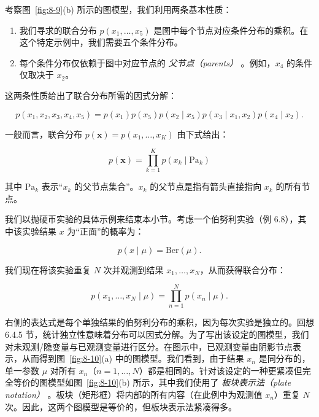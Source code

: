 考察图~\ref{fig:8-9}(b) 所示的图模型，我们利用两条基本性质：

\begin{enumerate}
\item 我们寻求的联合分布 $ p(x_1, \ldots, x_5) $ 是图中每个节点对应条件分布的乘积。在这个特定示例中，我们需要五个条件分布。
\item 每个条件分布仅依赖于图中对应节点的 \emph{父节点（parents）} 。例如，$ x_4 $ 的条件仅取决于 $ x_2 $。
\end{enumerate}

这两条性质给出了联合分布所需的因式分解：

\begin{equation}
p(x_1, x_2, x_3, x_4, x_5) = p(x_1) p(x_5) p(x_2 \mid x_5) p(x_3 \mid x_1, x_2) p(x_4 \mid x_2) .
\tag{8.30}\label{eq:8-30}
\end{equation}

一般而言，联合分布 $ p(\boldsymbol{x}) = p(x_1, \ldots, x_K) $ 由下式给出：

\begin{equation}
p(\boldsymbol{x}) = \prod_{k=1}^K p\left(x_k \mid \text{Pa}_k\right)
\tag{8.31}\label{eq:8-31}
\end{equation}

其中 $ \text{Pa}_k $ 表示“$ x_k $ 的父节点集合”。$ x_k $ 的父节点是指有箭头直接指向 $ x_k $ 的所有节点。

我们以抛硬币实验的具体示例来结束本小节。考虑一个伯努利实验（例 6.8），其中该实验结果 $ x $ 为“正面”的概率为：

\begin{equation}
p(x \mid \mu) = \text{Ber}(\mu) .
\tag{8.32}\label{eq:8-32}
\end{equation}

我们现在将该实验重复 $ N $ 次并观测到结果 $ x_1, \ldots, x_N $，从而获得联合分布：

\begin{equation}
p(x_1, \ldots, x_N \mid \mu) = \prod_{n=1}^N p(x_n \mid \mu) .
\tag{8.33}\label{eq:8-33}
\end{equation}

右侧的表达式是每个单独结果的伯努利分布的乘积，因为每次实验是独立的。回想 6.4.5 节，统计独立性意味着分布可以因式分解。为了写出该设定的图模型，我们对未观测/隐变量与已观测变量进行区分。在图示中，已观测变量由阴影节点表示，从而得到图~\ref{fig:8-10}(a) 中的图模型。我们看到，由于结果 $ x_n $ 是同分布的，单一参数 $ \mu $ 对所有 $ x_n $（$ n = 1, \ldots, N $）都是相同的。针对该设定的一种更紧凑但完全等价的图模型如图~\ref{fig:8-10}(b) 所示，其中我们使用了 \emph{板块表示法（plate notation）} 。板块（矩形框）将内部的所有内容（在此例中为观测值 $ x_n $）重复 $ N $ 次。因此，这两个图模型是等价的，但板块表示法紧凑得多。



